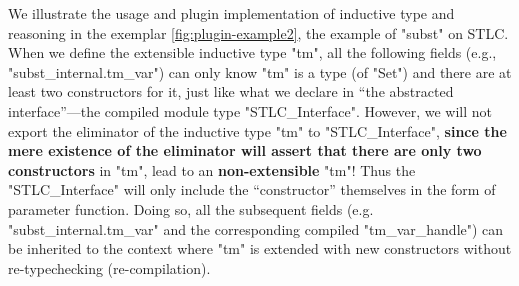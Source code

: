 

We illustrate the usage and plugin implementation of inductive type and reasoning in the exemplar \cref{fig:plugin-example2}, the example of
"subst" on STLC. When we define the extensible inductive type "tm", all
the following fields (e.g., "subst_internal.tm_var") can only know "tm"
is a type (of "Set") and there are at least two constructors for it,
just like what we declare in ``the abstracted interface''---the compiled
module type "STLC_Interface". However, we will not export
the eliminator of the inductive type "tm" to "STLC_Interface", \textbf{since
the mere existence of the eliminator will assert that there are only two
constructors} in "tm", lead to an \textbf{non-extensible} "tm"! Thus the "STLC_Interface" will only include the ``constructor'' themselves in the form of parameter function. Doing so, all the subsequent fields (e.g. "subst_internal.tm_var" and the corresponding compiled "tm_var_handle") can be inherited to the
context where "tm" is extended with new constructors without re-typechecking (re-compilation). 

